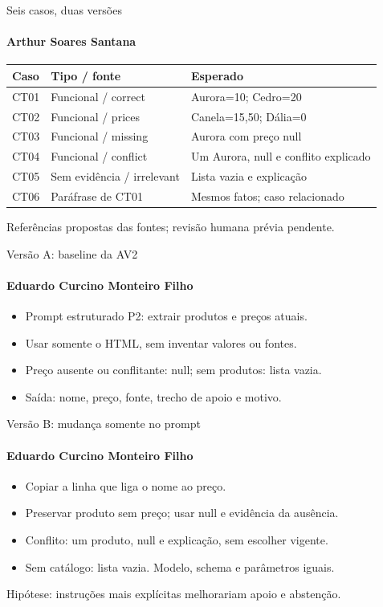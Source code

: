 \documentclass[aspectratio=169,11pt]{beamer}
\newcommand{\pessoa}[1]{\framesubtitle{#1}}
\begin{document}
\begin{frame}{Seis casos, duas versões}
\pessoa{Arthur Soares Santana}
\small\begin{tabular}{@{}llp{7.5cm}@{}}\toprule
Caso & Tipo / fonte & Esperado \\\midrule
CT01 & Funcional / correct & Aurora=10; Cedro=20 \\
CT02 & Funcional / prices & Canela=15,50; Dália=0 \\
CT03 & Funcional / missing & Aurora com preço null \\
CT04 & Funcional / conflict & Um Aurora, null e conflito explicado \\
CT05 & Sem evidência / irrelevant & Lista vazia e explicação \\
CT06 & Paráfrase de CT01 & Mesmos fatos; caso relacionado \\\bottomrule
\end{tabular}\par\bigskip
\alert{Referências propostas das fontes; revisão humana prévia pendente.}
\end{frame}
\begin{frame}{Versão A: baseline da AV2}
\pessoa{Eduardo Curcino Monteiro Filho}
\begin{itemize}\setlength{\itemsep}{1em}
\item Prompt estruturado P2: extrair produtos e preços atuais.
\item Usar somente o HTML, sem inventar valores ou fontes.
\item Preço ausente ou conflitante: null; sem produtos: lista vazia.
\item Saída: nome, preço, fonte, trecho de apoio e motivo.
\end{itemize}\end{frame}
\begin{frame}{Versão B: mudança somente no prompt}
\pessoa{Eduardo Curcino Monteiro Filho}
\begin{itemize}\setlength{\itemsep}{0.8em}
\item Copiar a linha que liga o nome ao preço.
\item Preservar produto sem preço; usar null e evidência da ausência.
\item Conflito: um produto, null e explicação, sem escolher vigente.
\item Sem catálogo: lista vazia. Modelo, schema e parâmetros iguais.
\end{itemize}\bigskip
Hipótese: instruções mais explícitas melhorariam apoio e abstenção.
\end{frame}
\end{document}
